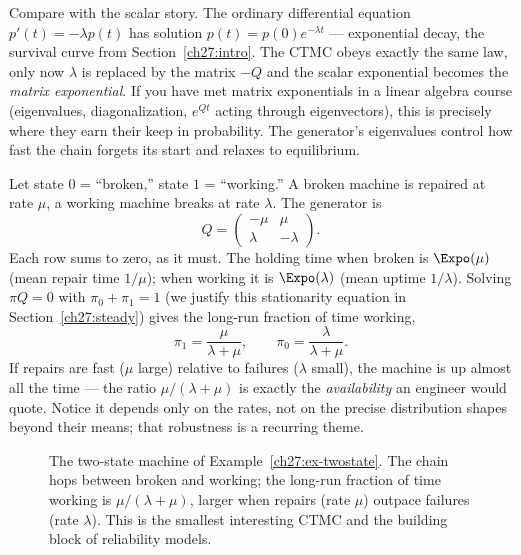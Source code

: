 \begin{connectionbox}
Compare with the scalar story. The ordinary differential equation $p'(t) = -\lambda p(t)$ has
solution $p(t) = p(0)e^{-\lambda t}$ --- exponential decay, the survival curve from
Section~\ref{ch27:intro}. The CTMC obeys exactly the same law, only now $\lambda$ is replaced by the
matrix $-Q$ and the scalar exponential becomes the \emph{matrix exponential}. If you have met
matrix exponentials in a linear algebra course (eigenvalues, diagonalization, $e^{Qt}$ acting
through eigenvectors), this is precisely where they earn their keep in probability. The generator's
eigenvalues control how fast the chain forgets its start and relaxes to equilibrium.
\end{connectionbox}

\begin{example}
\label{ch27:ex-twostate}
Let state $0$ = ``broken,'' state $1$ = ``working.'' A broken machine is repaired at rate $\mu$, a
working machine breaks at rate $\lambda$. The generator is
\[
  Q = \begin{pmatrix} -\mu & \mu \\ \lambda & -\lambda \end{pmatrix}.
\]
Each row sums to zero, as it must. The holding time when broken is $\Expo(\mu)$ (mean repair time
$1/\mu$); when working it is $\Expo(\lambda)$ (mean uptime $1/\lambda$). Solving $\pi Q = 0$ with
$\pi_0 + \pi_1 = 1$ (we justify this stationarity equation in Section~\ref{ch27:steady}) gives the
long-run fraction of time working,
\[
  \pi_1 = \frac{\mu}{\lambda + \mu},
  \qquad \pi_0 = \frac{\lambda}{\lambda + \mu}.
\]
If repairs are fast ($\mu$ large) relative to failures ($\lambda$ small), the machine is up almost
all the time --- the ratio $\mu/(\lambda+\mu)$ is exactly the \emph{availability} an engineer would
quote. Notice it depends only on the rates, not on the precise distribution shapes beyond their
means; that robustness is a recurring theme.
\end{example}

\begin{figure}[H]
\centering
{}
\caption{The two-state machine of Example~\ref{ch27:ex-twostate}. The chain hops between broken and
working; the long-run fraction of time working is $\mu/(\lambda+\mu)$, larger when repairs (rate
$\mu$) outpace failures (rate $\lambda$). This is the smallest interesting CTMC and the building block
of reliability models.}
\label{ch27:fig-twostate}
\end{figure}

